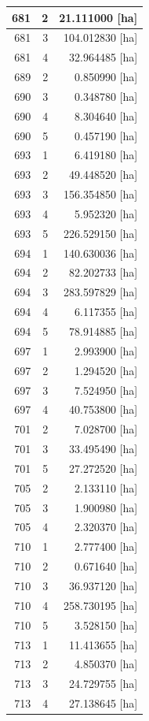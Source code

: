 \documentclass[11pt,]{book}
\begin{document}
\begin{table}
\begin{tabular}[t]{r|r|r}
\hline
681 & 2 & 21.111000 [ha]\\
\hline
681 & 3 & 104.012830 [ha]\\
\hline
681 & 4 & 32.964485 [ha]\\
\hline
689 & 2 & 0.850990 [ha]\\
\hline
690 & 3 & 0.348780 [ha]\\
\hline
690 & 4 & 8.304640 [ha]\\
\hline
690 & 5 & 0.457190 [ha]\\
\hline
693 & 1 & 6.419180 [ha]\\
\hline
693 & 2 & 49.448520 [ha]\\
\hline
693 & 3 & 156.354850 [ha]\\
\hline
693 & 4 & 5.952320 [ha]\\
\hline
693 & 5 & 226.529150 [ha]\\
\hline
694 & 1 & 140.630036 [ha]\\
\hline
694 & 2 & 82.202733 [ha]\\
\hline
694 & 3 & 283.597829 [ha]\\
\hline
694 & 4 & 6.117355 [ha]\\
\hline
694 & 5 & 78.914885 [ha]\\
\hline
697 & 1 & 2.993900 [ha]\\
\hline
697 & 2 & 1.294520 [ha]\\
\hline
697 & 3 & 7.524950 [ha]\\
\hline
697 & 4 & 40.753800 [ha]\\
\hline
701 & 2 & 7.028700 [ha]\\
\hline
701 & 3 & 33.495490 [ha]\\
\hline
701 & 5 & 27.272520 [ha]\\
\hline
705 & 2 & 2.133110 [ha]\\
\hline
705 & 3 & 1.900980 [ha]\\
\hline
705 & 4 & 2.320370 [ha]\\
\hline
710 & 1 & 2.777400 [ha]\\
\hline
710 & 2 & 0.671640 [ha]\\
\hline
710 & 3 & 36.937120 [ha]\\
\hline
710 & 4 & 258.730195 [ha]\\
\hline
710 & 5 & 3.528150 [ha]\\
\hline
713 & 1 & 11.413655 [ha]\\
\hline
713 & 2 & 4.850370 [ha]\\
\hline
713 & 3 & 24.729755 [ha]\\
\hline
713 & 4 & 27.138645 [ha]\\

\end{tabular}
\end{table}
\end{document}
